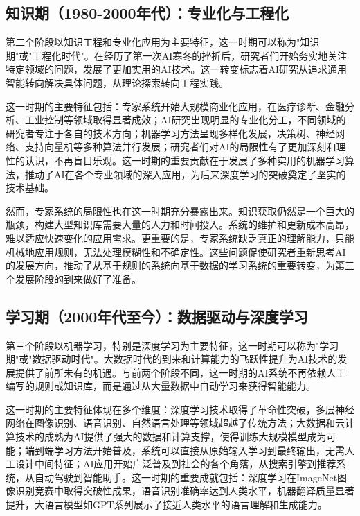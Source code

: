 \subsection{知识期（1980-2000年代）：专业化与工程化}

第二个阶段以知识工程和专业化应用为主要特征，这一时期可以称为"知识期"或"工程化时代"。在经历了第一次AI寒冬的挫折后，研究者们开始务实地关注特定领域的问题，发展了更加实用的AI技术。这一转变标志着AI研究从追求通用智能转向解决具体问题，从理论探索转向工程实践。

这一时期的主要特征包括：专家系统开始大规模商业化应用，在医疗诊断、金融分析、工业控制等领域取得显著成效；AI研究出现明显的专业化分工，不同领域的研究者专注于各自的技术方向；机器学习方法呈现多样化发展，决策树、神经网络、支持向量机等多种算法并行发展；研究者们对AI的局限性有了更加深刻和理性的认识，不再盲目乐观。这一时期的重要贡献在于发展了多种实用的机器学习算法，推动了AI在各个专业领域的深入应用，为后来深度学习的突破奠定了坚实的技术基础。

然而，专家系统的局限性也在这一时期充分暴露出来。知识获取仍然是一个巨大的瓶颈，构建大型知识库需要大量的人力和时间投入。系统的维护和更新成本高昂，难以适应快速变化的应用需求。更重要的是，专家系统缺乏真正的理解能力，只能机械地应用规则，无法处理模糊性和不确定性。这些问题促使研究者重新思考AI的发展方向，推动了从基于规则的系统向基于数据的学习系统的重要转变，为第三个发展阶段的到来做好了准备。

\subsection{学习期（2000年代至今）：数据驱动与深度学习}

第三个阶段以机器学习，特别是深度学习为主要特征，这一时期可以称为"学习期"或"数据驱动时代"。大数据时代的到来和计算能力的飞跃性提升为AI技术的发展提供了前所未有的机遇。与前两个阶段不同，这一时期的AI系统不再依赖人工编写的规则或知识库，而是通过从大量数据中自动学习来获得智能能力。

这一时期的主要特征体现在多个维度：深度学习技术取得了革命性突破，多层神经网络在图像识别、语音识别、自然语言处理等领域超越了传统方法；大数据和云计算技术的成熟为AI提供了强大的数据和计算支撑，使得训练大规模模型成为可能；端到端学习方法开始普及，系统可以直接从原始输入学习到最终输出，无需人工设计中间特征；AI应用开始广泛普及到社会的各个角落，从搜索引擎到推荐系统，从自动驾驶到智能助手。这一时期的重要成就包括：深度学习在ImageNet图像识别竞赛中取得突破性成果，语音识别准确率达到人类水平，机器翻译质量显著提升，大语言模型如GPT系列展示了接近人类水平的语言理解和生成能力。

